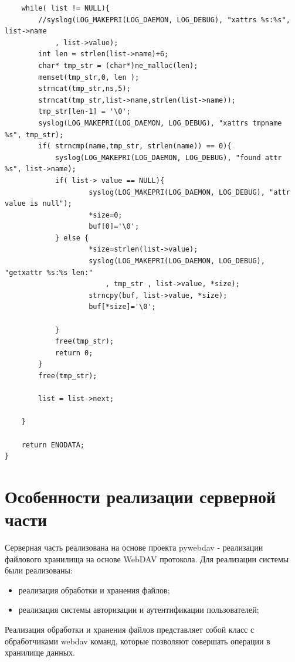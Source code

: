 \documentclass[utf8,usehyperref,12pt]{G7-32}
\begin{document}
\begin{verbatim}
    while( list != NULL){
    	//syslog(LOG_MAKEPRI(LOG_DAEMON, LOG_DEBUG), "xattrs %s:%s", list->name
    		, list->value);
    	int len = strlen(list->name)+6;
		char* tmp_str = (char*)ne_malloc(len);
		memset(tmp_str,0, len );
		strncat(tmp_str,ns,5);
		strncat(tmp_str,list->name,strlen(list->name));
		tmp_str[len-1] = '\0';
		syslog(LOG_MAKEPRI(LOG_DAEMON, LOG_DEBUG), "xattrs tmpname %s", tmp_str);
		if( strncmp(name,tmp_str, strlen(name)) == 0){
			syslog(LOG_MAKEPRI(LOG_DAEMON, LOG_DEBUG), "found attr %s", list->name);
	    	if( list-> value == NULL){
	    			syslog(LOG_MAKEPRI(LOG_DAEMON, LOG_DEBUG), "attr value is null");
	 	   			*size=0;
	    			buf[0]='\0';
	    	} else {
	    			*size=strlen(list->value);
	    			syslog(LOG_MAKEPRI(LOG_DAEMON, LOG_DEBUG), "getxattr %s:%s len:"
		    			, tmp_str , list->value, *size);
					strncpy(buf, list->value, *size);
					buf[*size]='\0';

	    	}
	    	free(tmp_str);
			return 0;
		}
		free(tmp_str);

    	list = list->next;

    }

    return ENODATA;
}
\end{verbatim}

\section{Особенности реализации серверной части}

Серверная часть реализована на основе проекта pywebdav - реализации файлового хранилища на основе WebDAV протокола. Для реализации системы были реализованы: 
\begin{itemize}
 \item реализация обработки и хранения файлов;
 \item реализация системы авторизации и аутентификации пользователей;
\end{itemize}

Реализация обработки и хранения файлов представляет собой класс с обработчиками webdav команд, которые позволяют совершать операции в хранилище данных.
\end{document}
